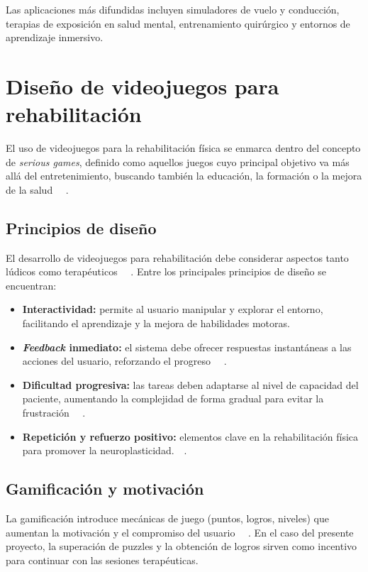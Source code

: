 Las aplicaciones más difundidas incluyen simuladores de vuelo y conducción, terapias de exposición en salud mental, entrenamiento quirúrgico y entornos de aprendizaje inmersivo.

\section{Diseño de videojuegos para rehabilitación}

El uso de videojuegos para la rehabilitación física se enmarca dentro del concepto de \textit{serious games}, definido como aquellos juegos cuyo principal objetivo va más allá del entretenimiento, buscando también la educación, la formación o la mejora de la salud ~~\cite{david2016serious}.

\subsection{Principios de diseño}

El desarrollo de videojuegos para rehabilitación debe considerar aspectos tanto lúdicos como terapéuticos ~~\cite{greene2016rehab}. Entre los principales principios de diseño se encuentran:

\begin{itemize}
    \item \textbf{Interactividad:} permite al usuario manipular y explorar el entorno, facilitando el aprendizaje y la mejora de habilidades motoras.
    \item \textbf{\textit{Feedback} inmediato:} el sistema debe ofrecer respuestas instantáneas a las acciones del usuario, reforzando el progreso ~~\cite{cameirao2010impact}.
    \item \textbf{Dificultad progresiva:} las tareas deben adaptarse al nivel de capacidad del paciente, aumentando la complejidad de forma gradual para evitar la frustración ~~\cite{zimmerli2012virtual}.
    \item \textbf{Repetición y refuerzo positivo:} elementos clave en la rehabilitación física para promover la neuroplasticidad.~~\cite{holden2005virtual}.
\end{itemize}

\subsection{Gamificación y motivación}

La gamificación introduce mecánicas de juego (puntos, logros, niveles) que aumentan la motivación y el compromiso del usuario ~~\cite{sardi2017gamification}. En el caso del presente proyecto, la superación de puzzles y la obtención de logros sirven como incentivo para continuar con las sesiones terapéuticas.

